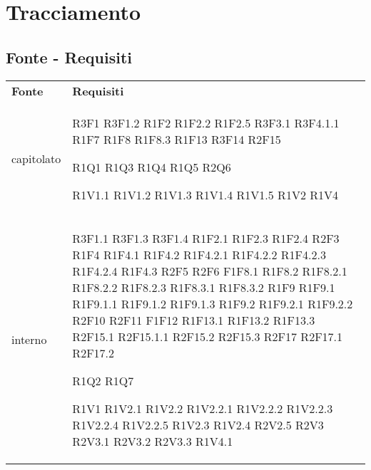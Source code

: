 \section{Tracciamento}
	\subsection{Fonte - Requisiti}
	\begin{longtable} {
		>{\centering}p{28mm}  
		>{}p{20mm}
		}
	\rowcolor{gray!50}
		\textbf{Fonte} & \textbf{Requisiti}	\TBstrut \\
				
		capitolato & 
		R3F1 
		R3F1.2 
		R1F2 
		R1F2.2 
		R1F2.5 
		R3F3.1 
		R3F4.1.1 
		R1F7 
		R1F8 
		R1F8.3 
		R1F13 
		R3F14 
		R2F15 
				
		R1Q1 
		R1Q3 
		R1Q4 
		R1Q5 
		R2Q6
		 
		R1V1.1 
		R1V1.2 
		R1V1.3 
		R1V1.4 
		R1V1.5 
		R1V2 
		R1V4 \TBstrut \\ [2mm]
				
		interno & 
		R3F1.1 
		R3F1.3 
		R3F1.4 
		R1F2.1 
		R1F2.3 
		R1F2.4 
		R2F3 
		R1F4 
		R1F4.1 
		R1F4.2 
		R1F4.2.1 
		R1F4.2.2 
		R1F4.2.3 
		R1F4.2.4 
		R1F4.3 
		R2F5 
		R2F6 
		F1F8.1 
		R1F8.2 
		R1F8.2.1 
		R1F8.2.2 
		R1F8.2.3 
		R1F8.3.1 
		R1F8.3.2 
		R1F9 
		R1F9.1 
		R1F9.1.1 
		R1F9.1.2 
		R1F9.1.3 
		R1F9.2 
		R1F9.2.1 
		R1F9.2.2 
		R2F10 
		R2F11 
		F1F12 
		R1F13.1 
		R1F13.2 
		R1F13.3 
		R2F15.1 
		R2F15.1.1 
		R2F15.2 
		R2F15.3 
		R2F17 
		R2F17.1 
		R2F17.2
		
		R1Q2 
		R1Q7 
		
		R1V1 
		R1V2.1 
		R1V2.2 
		R1V2.2.1 
		R1V2.2.2 
		R1V2.2.3 
		R1V2.2.4 
		R1V2.2.5 
		R1V2.3 
		R1V2.4 
		R2V2.5 
		R2V3 
		R2V3.1 
		R2V3.2 
		R2V3.3 
		R1V4.1\TBstrut \\ [2mm]
				

\end{longtable}
